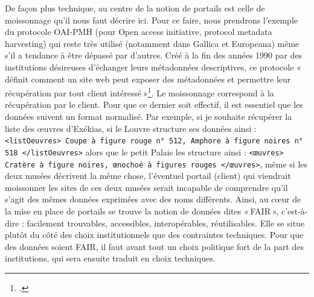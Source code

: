 De façon plus technique, au centre de la notion de portails est celle de moissonnage qu’il nous faut décrire ici. Pour ce faire, nous prendrons l’exemple du protocole OAI-PMH (pour Open access initiative, protocol metadata harvesting) qui reste très utilisé (notamment dans Gallica et Europeana) même s’il a tendance à être dépassé par d’autres. Créé à la fin des années 1990 par des institutions désireuses d’échanger leurs métadonnées descriptives, ce protocole « définit comment un site web peut exposer des métadonnées et permettre leur récupération par tout client intéressé »\footcite[§ 22]{mesguich_5_2017}. Le moissonnage correspond à la récupération par le client. Pour que ce dernier soit effectif, il est essentiel que les données suivent un format normalisé. Par exemple, si je souhaite récupérer la liste des œuvres d’Exékias, si le Louvre structure ses données ainsi : \texttt{<listOeuvres> Coupe à figure rouge n° 512, Amphore à figure noires n° 518 </listOeuvres>} alors que le petit Palais les structure ainsi : \texttt{<œuvres> Cratère à figure noires, œnochoé à figures rouges </œuvres>}, même si les deux musées décrivent la même chose, l’éventuel portail (client) qui viendrait moissonner les sites de ces deux musées serait incapable de comprendre qu’il s’agit des mêmes données exprimées avec des noms différents. Ainsi, au cœur de la mise en place de portails se trouve la notion de données dites « FAIR », c’est-à-dire : facilement trouvables, accessibles, interopérables, réutilisables. Elle se situe plutôt du côté des choix institutionnels que des contraintes techniques. Pour que des données soient FAIR, il faut avant tout un choix politique fort de la part des institutions, qui sera ensuite traduit en choix techniques.

